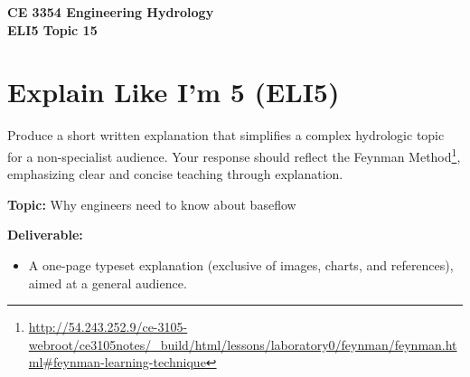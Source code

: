 \documentclass[12pt]{article}
\begin{document}
\begin{center}
    \textbf{CE 3354 Engineering Hydrology\\
    ELI5 Topic 15}
\end{center}

\section*{Explain Like I’m 5 (ELI5)}

Produce a short written explanation that simplifies a complex hydrologic topic for a non-specialist audience. Your response should reflect the Feynman Method\footnote{\url{http://54.243.252.9/ce-3105-webroot/ce3105notes/_build/html/lessons/laboratory0/feynman/feynman.html#feynman-learning-technique}}, emphasizing clear and concise teaching through explanation.

\textbf{Topic:} Why engineers need to know about baseflow

\textbf{Deliverable:}
\begin{itemize}
    \item A one-page typeset explanation (exclusive of images, charts, and references), aimed at a general audience.
\end{itemize}
\end{document}
